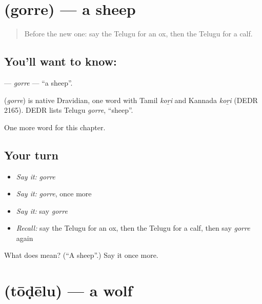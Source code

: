 \section[\texorpdfstring{\te{గొర్రె} (gorre)}{గొర్రె (gorre)}]{ (gorre) — a sheep}

\label{lesson:TE-C302-gorre}



\begin{quote}
Before the new one: say the Telugu for an ox, then the Telugu for a calf.
\end{quote}

\subsection*{You'll want to know: }
\textbf{} — \emph{gorre} — \textquotedblleft{}a sheep\textquotedblright{}.

\begin{cousinweb}
\textbf{} (\emph{gorre}) is native Dravidian, one word with Tamil \emph{koṟi} and Kannada \emph{koṟi} (DEDR 2165). DEDR lists Telugu \emph{gorre}, \textquotedblleft{}sheep\textquotedblright{}.
\end{cousinweb}

\begin{grammarlens}[title={What you've built}]
One more word for this chapter.
\end{grammarlens}

\subsection*{Your turn}
\begin{itemize}
\raggedright
  \item \emph{Say it:} \emph{gorre}
  \item \emph{Say it:} \emph{gorre}, once more
  \item \emph{Say it:} say \emph{gorre}
  \item \emph{Recall:} say the Telugu for an ox, then the Telugu for a calf, then say \emph{gorre} again
\end{itemize}

\begin{tcolorbox}[breakable,colback=teal!4,colframe=teal!35!black,title={Before you move on}]
What does  mean? (\textquotedblleft{}A sheep\textquotedblright{}.) Say it once more.
\end{tcolorbox}
\section[\texorpdfstring{\te{తోడేలు} (tōḍēlu)}{తోడేలు (tōḍēlu)}]{ (tōḍēlu) — a wolf}


